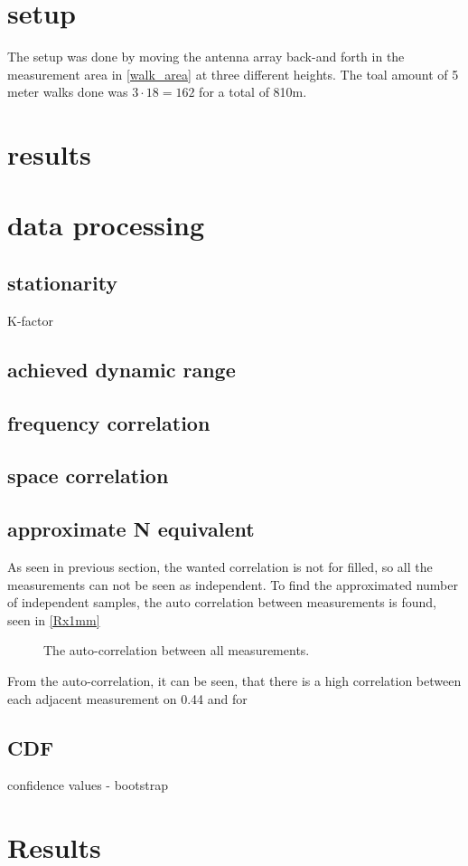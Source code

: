 \section{setup}
The setup was done by moving the antenna array back-and forth in the measurement area in \autoref{walk_area} at three different heights. The toal amount of 5 meter walks done was $3 \cdot 18 = 162$ for a total of 810m.
\section{results}
\section{data processing}
\subsection{stationarity}
K-factor
\subsection{achieved dynamic range}
\subsection{frequency correlation}
\subsection{space correlation}
\subsection{approximate N equivalent}
As seen in previous section, the wanted correlation is not for filled, so all the measurements can not be seen as independent. To find the approximated number of independent samples, the auto correlation between measurements is found, seen in \autoref{Rx1mm}

\begin{figure}[H]

\caption{The auto-correlation between all measurements.}
\label{Rx1mm}
\end{figure}

From the auto-correlation, it can be seen, that there is a high correlation between each adjacent measurement on 0.44 and for 



\subsection{CDF}
confidence values - bootstrap

\section{Results}